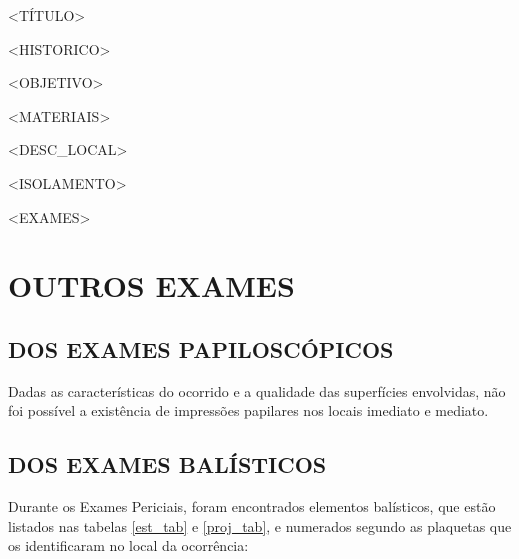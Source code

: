 \documentclass[a4paper,12pt,oneside]{article}
\newcounter{c}
\newcounter{d}
\newcounter{u}
\begin{document}
\tableofcontents
\setcounter{page}{2}
\newpage

\begin{centering}
<TÍTULO>

\end{centering}

<HISTORICO>

<OBJETIVO>

<MATERIAIS>

<DESC_LOCAL>

<ISOLAMENTO>

<EXAMES>


\section{OUTROS EXAMES}

\subsection{DOS EXAMES PAPILOSCÓPICOS}

Dadas as características do ocorrido e a qualidade das superfícies envolvidas, não foi possível a existência de impressões papilares nos locais imediato e mediato.

\subsection{DOS EXAMES BALÍSTICOS \label{balistica}}

Durante os Exames Periciais, foram encontrados elementos balísticos, que estão listados nas tabelas \ref{est_tab} e \ref{proj_tab}, e numerados segundo as plaquetas que os identificaram no local da ocorrência:
\end{document}
